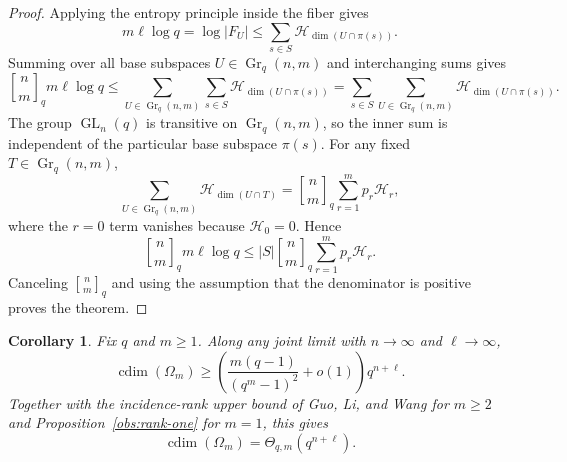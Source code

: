 \documentclass[11pt]{article}
\newtheorem{corollary}[theorem]{Corollary}
\theoremstyle{definition}
\theoremstyle{remark}
\newcommand{\Gr}{\operatorname{Gr}}
\newcommand{\cdim}{\operatorname{cdim}}
\newcommand{\qbinom}[2]{\genfrac{[}{]}{0pt}{}{#1}{#2}_q}
\begin{document}
\begin{proof}
Applying the entropy principle inside the fiber gives
\[
        m\ell\log q=\log |F_U|
        \leq
        \sum_{s\in S} \mathcal H_{\dim(U\cap \pi(s))}.
\]
Summing over all base subspaces \(U\in\Gr_q(n,m)\) and interchanging sums 
gives  
\[
        \qbinom{n}{m}m\ell\log q
        \leq
        \sum_{U\in\Gr_q(n,m)}
        \sum_{s\in S}
        \mathcal H_{\dim(U\cap \pi(s))}
        =
        \sum_{s\in S}
        \sum_{U\in\Gr_q(n,m)}
        \mathcal H_{\dim(U\cap \pi(s))}.
\]
The group \(\operatorname{GL}_n(q)\) is transitive on \(\Gr_q(n,m)\), so 
the inner sum is independent of the particular base subspace \(\pi(s)\).  
For any fixed \(T\in\Gr_q(n,m)\),
\[
        \sum_{U\in\Gr_q(n,m)}
        \mathcal H_{\dim(U\cap T)}
        =
        \qbinom{n}{m}
        \sum_{r=1}^m p_r\mathcal H_r,
\]
where the \(r=0\) term vanishes because \(\mathcal H_0=0\).  Hence
\[
        \qbinom{n}{m}m\ell\log q
        \leq
        |S|\qbinom{n}{m}
        \sum_{r=1}^m p_r\mathcal H_r.
\]
Canceling \(\qbinom{n}{m}\) and using the assumption that the denominator 
is positive proves the theorem.
\end{proof}


\begin{corollary}\label{cor:attenuated-fixedrank}
Fix \(q\) and \(m\geq1\).  Along any joint limit with
\(n\to\infty\) and \(\ell\to\infty\),
\[
        \cdim(\Omega_m)
        \geq
        \left(\frac{m(q-1)}{(q^m-1)^2}+o(1)\right)q^{n+\ell}.
\]
Together with the incidence-rank upper bound of Guo, Li, and Wang for \(m\geq2\)
and Proposition~\ref{obs:rank-one} for \(m=1\), this gives
\[
        \cdim(\Omega_m)=\Theta_{q,m}(q^{n+\ell}).
\]
\end{corollary}
\end{document}
